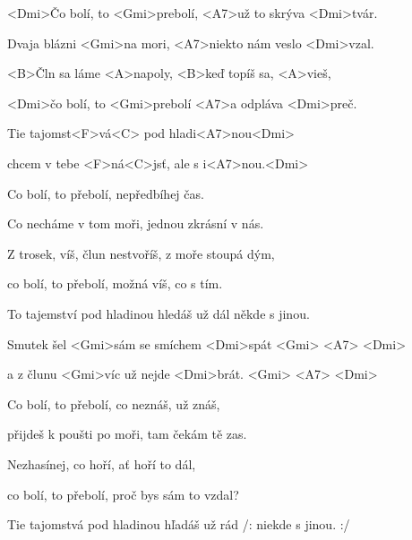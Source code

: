 

\zs
<Dmi>Čo bolí, to <Gmi>prebolí, <A7>už to skrýva <Dmi>tvár.

Dvaja blázni <Gmi>na mori, <A7>niekto nám veslo <Dmi>vzal. 

<B>Čln sa láme <A>napoly, <B>keď topíš sa, <A>vieš, 

<Dmi>čo bolí, to <Gmi>prebolí <A7>a odpláva <Dmi>preč. 
\ks

\zr
Tie tajomst<F>vá<C> pod hladi<A7>nou<Dmi>

chcem v tebe <F>ná<C>jsť, ale s i<A7>nou.<Dmi> 
\kr

\zs
Co bolí, to přebolí, nepředbíhej čas.

Co necháme v tom moři, jednou zkrásní v nás. 

Z trosek, víš, člun nestvoříš, z moře stoupá dým, 

co bolí, to přebolí, možná víš, co s tím. 
\ks
 
\zr
To tajemství pod hladinou hledáš už dál někde s jinou. 
\kr
 
\zs
Smutek šel <Gmi>sám se smíchem <Dmi>spát <Gmi> <A7> <Dmi>

a z člunu <Gmi>víc už nejde <Dmi>brát. <Gmi> <A7> <Dmi>
\ks

\zs
Co bolí, to přebolí, co neznáš, už znáš, 

přijdeš k poušti po moři, tam čekám tě zas. 

Nezhasínej, co hoří, ať hoří to dál, 

co bolí, to přebolí, proč bys sám to vzdal? 
\ks

\zr
Tie tajomstvá pod hladinou hľadáš už rád /: niekde s jinou. :/
\kr

\kp
